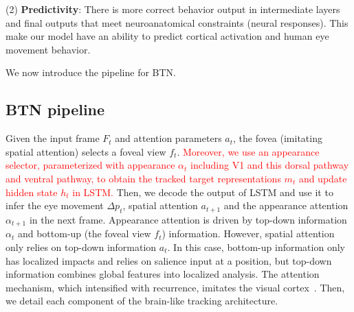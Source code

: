 \documentclass[sn-mathphys]{sn-jnl}%
\theoremstyle{thmstyleone}%
\theoremstyle{thmstyletwo}%
\theoremstyle{thmstylethree}%
\begin{document}
(2) \textbf{Predictivity}: 
There is more correct behavior output in intermediate layers and final outputs that meet neuroanatomical constraints (neural responses). 
This make our model have an ability to predict cortical activation and human eye movement behavior.

We now introduce the pipeline for BTN. 


\subsection{BTN pipeline} \label{sec:cornet_s_def}

Given the input frame $F_t$ and attention parameters $a_t$, the fovea (imitating spatial attention) selects a foveal view $f_t$. 
\textcolor{red}{Moreover, we use an appearance selector, parameterized with appearance $\alpha _t$ including V1 and this dorsal pathway and ventral pathway, to obtain the tracked target representations $m_t$ 
	and update hidden state $h_t$ in LSTM.}
Then, we decode the output of LSTM and use it to infer the eye movement $\Delta p_t$, spatial attention $a_{t+1}$ and the appearance attention $\alpha _{t+1}$ in the next frame.  
Appearance attention is driven by top-down information $\alpha _t$ and bottom-up (the foveal view $f_t$) information. 
However, spatial attention only relies on top-down information $a_t$.
In this case, bottom-up information only has localized impacts and relies on salience input at a position, 
but top-down information combines global features into localized analysis. 
The attention mechanism, which intensified with recurrence, imitates the visual cortex~\cite{attention}.
Then, we detail each component of the brain-like tracking architecture. 


\end{document}
